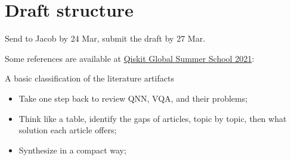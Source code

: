 \section{Draft structure}
Send to Jacob by 24 Mar, submit the draft by 27 Mar.

Some references are available at \href{https://www.youtube.com/watch?v=0ENQXz9tDww&list=PLOFEBzvs-VvqJwybFxkTiDzhf5E11p8BI&index=18}{Qiskit Global Summer School 2021}: 
\cite{mccleanBarrenPlateausQuantum2018, cerezoCostFunctionDependent2021, romeroQuantumAutoencodersEfficient2017, beerTrainingDeepQuantum2020, sharmaTrainabilityDissipativePerceptronbased2020, grantHierarchicalQuantumClassifiers2018, congQuantumConvolutionalNeural2019, pesahAbsenceBarrenPlateaus2021, wangNoiseinducedBarrenPlateaus2021, skolikLayerwiseLearningQuantum2021, grantInitializationStrategyAddressing2019,holmesConnectingAnsatzExpressibility2022,volkoffLargeGradientsCorrelation2021, marreroEntanglementinducedBarrenPlateaus2021, pattiEntanglementDevisedBarren2021, verdonLearningLearnQuantum2019, carolanVariationalQuantumUnsampling2020, manginiQuantumComputingModels2021}

A basic classification of the literature artifacts
\begin{itemize}
    \item Take one step back to review QNN, VQA, and their problems;
    \item Think like a table, identify the gaps of articles, topic by topic, then what solution each article offers;
    \item Synthesize in a compact way;
\end{itemize}